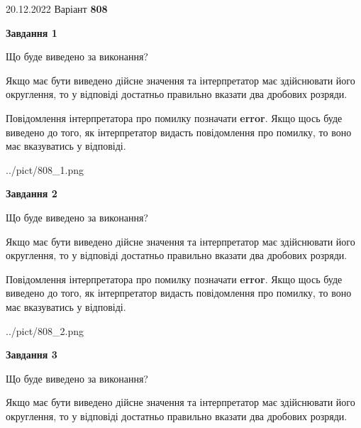 \documentclass[12pt, ukrainian]{article}
\begin{document}
{20.12.2022 Варіант \No \textbf { 808 }\par}
{
\begin {Large}

{\begin {center}\textbf{Завдання 1}\end {center}}\par
Що буде виведено за виконання? \par

Якщо має бути виведено дійсне значення та інтерпретатор має здійснювати його округлення, 
то у відповіді достатньо правильно вказати два дробових розряди.

Повідомлення інтерпретатора про помилку позначати \textbf{error}.
Якщо щось буде виведено до того, як інтерпретатор видасть повідомлення про помилку, 
то воно має вказуватись у відповіді. \par

\begin{center}
	{../pict/808_1.png}
\end{center}
\newpage

{\begin {center}\textbf{Завдання 2}\end {center}}\par
Що буде виведено за виконання? \par

Якщо має бути виведено дійсне значення та інтерпретатор має здійснювати його округлення, 
то у відповіді достатньо правильно вказати два дробових розряди.

Повідомлення інтерпретатора про помилку позначати \textbf{error}.
Якщо щось буде виведено до того, як інтерпретатор видасть повідомлення про помилку, 
то воно має вказуватись у відповіді. \par

\begin{center}
	{../pict/808_2.png}
\end{center}
\newpage

{\begin {center}\textbf{Завдання 3}\end {center}}\par
Що буде виведено за виконання? \par

Якщо має бути виведено дійсне значення та інтерпретатор має здійснювати його округлення, 
то у відповіді достатньо правильно вказати два дробових розряди.


\end{Large}}
\end{document}
